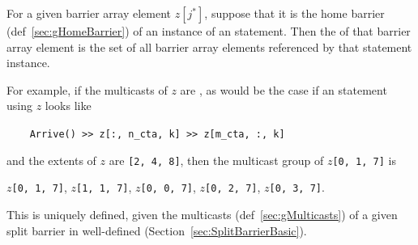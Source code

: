 
For a given barrier array element $z[j^*]$, suppose that it is the home barrier (def~\ref{sec:gHomeBarrier}) of an instance of an  statement.
Then the  of that barrier array element is the set of all barrier array elements referenced by that statement instance.

For example, if the multicasts of $z$ are , as would be the case if an  statement using $z$ looks like

\texttt{~~~~Arrive() >> z[:, n\_cta, k] >> z[m\_cta, :, k]}

and the extents of $z$ are \texttt{[2, 4, 8]}, then the multicast group of $z$\texttt{[0, 1, 7]} is

$z$\texttt{[0, 1, 7]}, $z$\texttt{[1, 1, 7]}, $z$\texttt{[0, 0, 7]}, $z$\texttt{[0, 2, 7]}, $z$\texttt{[0, 3, 7]}.

This is uniquely defined, given the multicasts (def~\ref{sec:gMulticasts}) of a given split barrier in well-defined (Section~\ref{sec:SplitBarrierBasic}).
